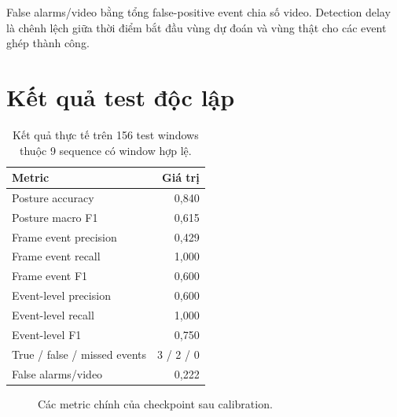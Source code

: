 \documentclass[12pt,a4paper,oneside]{report}
\begin{document}
False alarms/video bằng tổng false-positive event chia số video. Detection delay
là chênh lệch giữa thời điểm bắt đầu vùng dự đoán và vùng thật cho các event ghép
thành công.

\section{Kết quả test độc lập}

\begin{table}[H]
\centering
\caption{Kết quả thực tế trên 156 test windows thuộc 9 sequence có window hợp lệ.}
\begin{tabular}{lr}
\toprule
Metric & Giá trị \\
\midrule
Posture accuracy & 0,840 \\
Posture macro F1 & 0,615 \\
Frame event precision & 0,429 \\
Frame event recall & 1,000 \\
Frame event F1 & 0,600 \\
Event-level precision & 0,600 \\
Event-level recall & 1,000 \\
Event-level F1 & 0,750 \\
True / false / missed events & 3 / 2 / 0 \\
False alarms/video & 0,222 \\
\bottomrule
\end{tabular}
\end{table}

\begin{figure}[H]
\centering
{}
\caption{Các metric chính của checkpoint sau calibration.}
\end{figure}
\end{document}
